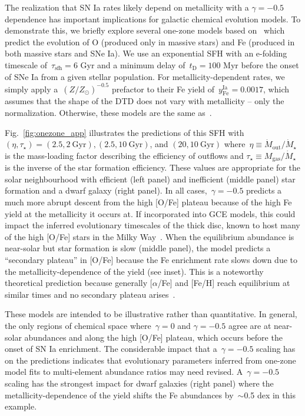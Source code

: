 \documentclass[ms.tex]{subfiles}
\begin{document}
The realization that SN Ia rates likely depend on metallicity with a
$\gamma = -0.5$ dependence has important implications for galactic chemical
evolution models.
To demonstrate this, we briefly explore several one-zone models based
on~\citet{Johnson2020} which predict the evolution of O (produced only in
massive stars) and Fe (produced in both massive stars and SNe Ia).
We use an exponential SFH with an e-folding timescale of~$\tau_\text{sfh} = 6$
Gyr and a minimum delay of~$t_\text{D} = 100$ Myr before the onset of SNe Ia
from a given stellar population.
For metallicity-dependent rates, we simply apply a~$(Z / Z_\odot)^{-0.5}$
prefactor to their Fe yield of~$y_\text{Fe}^\text{Ia} = 0.0017$, which assumes
that the shape of the DTD does not vary with metallicity -- only the
normalization.
Otherwise, these models are the same as~\citet{Johnson2020}.
\par
Fig.~\ref{fig:onezone_app} illustrates the predictions of this SFH with
$(\eta, \tau_\star) = (2.5, 2~\text{Gyr}), (2.5, 10~\text{Gyr})$, and
$(20, 10~\text{Gyr})$ where~$\eta \equiv \dot{M}_\text{out} / \dot{M}_\star$ is
the mass-loading factor describing the efficiency of outflows and
$\tau_\star \equiv M_\text{gas} / \dot{M}_\star$ is the inverse of the
star formation efficiency.
These values are appropriate for the solar neighbourhood with efficient (left
panel) and inefficient (middle panel) star formation and a dwarf galaxy
(right panel).
In all cases,~$\gamma = -0.5$ predicts a much more abrupt descent from the
high [O/Fe] plateau because of the high Fe yield at the metallicity it
occurs at.
If incorporated into GCE models, this could impact the inferred evolutionary
timescales of the thick disc, known to host many of the high [O/Fe] stars in
the Milky Way~\citep{Hayden2017}.
When the equilibrium abundance is near-solar but star formation is slow (middle
panel), the model predicts a ``secondary plateau'' in [O/Fe] because the Fe
enrichment rate slows down due to the metallicity-dependence of the yield
(see inset).
This is a noteworthy theoretical prediction because generally
[$\alpha$/Fe] and [Fe/H] reach equilibrium at similar times and no secondary
plateau arises~\citep[e.g.,][]{Weinberg2017}.
\par
These models are intended to be illustrative rather than quantitative.
In general, the only regions of chemical space where~$\gamma = 0$ and
$\gamma = -0.5$ agree are at near-solar abundances and along the high [O/Fe]
plateau, which occurs before the onset of SN Ia enrichment.
The considerable impact that a~$\gamma = -0.5$ scaling has on the predictions
indicates that evolutionary parameters inferred from one-zone model fits to
multi-element abundance ratios may need revised.
A~$\gamma = -0.5$ scaling has the strongest impact for dwarf galaxies (right
panel) where the metallicity-dependence of the yield shifts the Fe abundances
by~$\sim$0.5 dex in this example.
\end{document}

